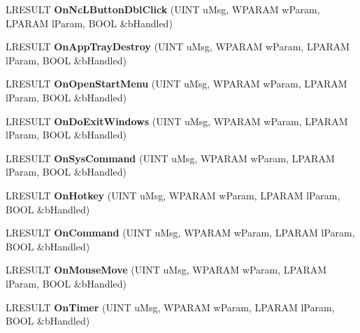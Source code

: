 \begin{DoxyCompactItemize}
L\+R\+E\+S\+U\+LT {\bfseries On\+Nc\+L\+Button\+Dbl\+Click} (U\+I\+NT u\+Msg, W\+P\+A\+R\+AM w\+Param, L\+P\+A\+R\+AM l\+Param, B\+O\+OL \&b\+Handled)
\item 
\mbox{\label{class_c_tray_window_abcf5528e1ca3b8d7169d5c461e4a7170}} 
L\+R\+E\+S\+U\+LT {\bfseries On\+App\+Tray\+Destroy} (U\+I\+NT u\+Msg, W\+P\+A\+R\+AM w\+Param, L\+P\+A\+R\+AM l\+Param, B\+O\+OL \&b\+Handled)
\item 
\mbox{\label{class_c_tray_window_aa8cf9a28b1237b7602d11993e1f7b667}} 
L\+R\+E\+S\+U\+LT {\bfseries On\+Open\+Start\+Menu} (U\+I\+NT u\+Msg, W\+P\+A\+R\+AM w\+Param, L\+P\+A\+R\+AM l\+Param, B\+O\+OL \&b\+Handled)
\item 
\mbox{\label{class_c_tray_window_a29374917688b7709e0e39ca03407bfdf}} 
L\+R\+E\+S\+U\+LT {\bfseries On\+Do\+Exit\+Windows} (U\+I\+NT u\+Msg, W\+P\+A\+R\+AM w\+Param, L\+P\+A\+R\+AM l\+Param, B\+O\+OL \&b\+Handled)
\item 
\mbox{\label{class_c_tray_window_a9c899078747d69e506ec6acbfe9aa253}} 
L\+R\+E\+S\+U\+LT {\bfseries On\+Sys\+Command} (U\+I\+NT u\+Msg, W\+P\+A\+R\+AM w\+Param, L\+P\+A\+R\+AM l\+Param, B\+O\+OL \&b\+Handled)
\item 
\mbox{\label{class_c_tray_window_a00caa8562362ec95366dad00664341fa}} 
L\+R\+E\+S\+U\+LT {\bfseries On\+Hotkey} (U\+I\+NT u\+Msg, W\+P\+A\+R\+AM w\+Param, L\+P\+A\+R\+AM l\+Param, B\+O\+OL \&b\+Handled)
\item 
\mbox{\label{class_c_tray_window_ab358ebba3660b69b7d21b902ea28153c}} 
L\+R\+E\+S\+U\+LT {\bfseries On\+Command} (U\+I\+NT u\+Msg, W\+P\+A\+R\+AM w\+Param, L\+P\+A\+R\+AM l\+Param, B\+O\+OL \&b\+Handled)
\item 
\mbox{\label{class_c_tray_window_a26726fbb0ebbb684dabe14e424954911}} 
L\+R\+E\+S\+U\+LT {\bfseries On\+Mouse\+Move} (U\+I\+NT u\+Msg, W\+P\+A\+R\+AM w\+Param, L\+P\+A\+R\+AM l\+Param, B\+O\+OL \&b\+Handled)
\item 
\mbox{\label{class_c_tray_window_a9203a9409ee29a3728286e31035941a5}} 
L\+R\+E\+S\+U\+LT {\bfseries On\+Timer} (U\+I\+NT u\+Msg, W\+P\+A\+R\+AM w\+Param, L\+P\+A\+R\+AM l\+Param, B\+O\+OL \&b\+Handled)

\end{DoxyCompactItemize}
